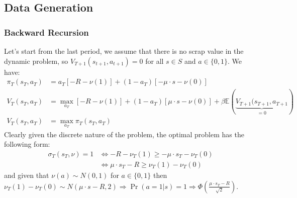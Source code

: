 \documentclass[english,letter,11pt,twoside]{article}
\begin{document}
\begin{center}
\subsection*{Data Generation}
\subsubsection*{Backward Recursion}
\end{center}

Let's start from the last period, we assume that there is no scrap value in the dynamic problem, so $V_{T+1}(s_{t+1},a_{t+1}) = 0 $ for all $ s \in S$ and $a \in \{ 0,1\}$. We have:
\begin{align*}
\pi_T\left( s_T,a_T \right) &=  a_T \left[ - R - \nu(1) \right] + (1 - a_T) \left[ - \mu \cdot s - \nu(0) \right] \\
V_T(s_T,a_T) &= \max_{a_T} \left[ - R - \nu(1) \right] + (1 - a_T) \left[ \mu \cdot s - \nu(0) \right] + \beta \mathbb{E} \left( \underbrace{V_{T+1}(s_{T+1},a_{T+1}}_{=0} \right) \\
V_T(s_T,a_T) &= \max_{a_T} \pi_T\left( s_T,a_T \right) 
\end{align*}
Clearly given the discrete nature of the problem, the optimal problem has the following form:
\begin{align*}
\sigma_T(s_T,\nu) = 1 &\iff - R - \nu_T(1) \geq - \mu \cdot s_T - \nu_T(0) \\
&\iff \mu \cdot s_T - R \geq \nu_T(1) - \nu_T(0)
\end{align*}
and given that $\nu(a) \sim N(0,1)$ for $a \in \{0,1\}$ then $\nu_T(1) - \nu_T(0) \sim N(\mu \cdot s - R , 2) \Rightarrow \Pr(a=1|s) = 1\Rightarrow \Phi \left( \frac{\mu \cdot s_T - R}{\sqrt{2}} \right)$. 
\end{document}
